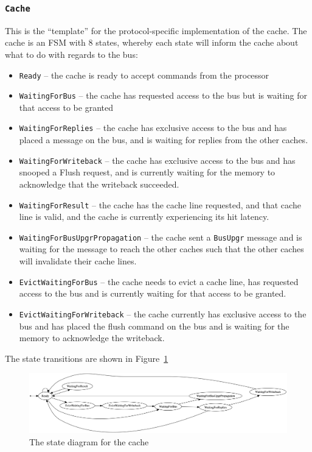 \documentclass[nonacm,acmsmall,screen,11pt]{acmart}
\begin{document}
\subsubsection{\texttt{Cache}}
This is the ``template'' for the protocol-specific implementation of the cache.
The cache is an FSM with 8 states, whereby each state will inform the cache about what to do with regards to the bus:
\begin{itemize}
  \item \texttt{Ready} -- the cache is ready to accept commands from the processor
  \item \texttt{WaitingForBus} -- the cache has requested access to the bus but is waiting for that access to be granted
  \item \texttt{WaitingForReplies} -- the cache has exclusive access to the bus and has placed a message on the bus, and is waiting for replies from the other caches.
  \item \texttt{WaitingForWriteback} -- the cache has exclusive access to the bus and has snooped a Flush request, and is currently waiting for the memory to acknowledge that the writeback succeeded.
  \item \texttt{WaitingForResult} -- the cache has the cache line requested, and that cache line is valid, and the cache is currently experiencing its hit latency.
  \item \texttt{WaitingForBusUpgrPropagation} -- the cache sent a \texttt{BusUpgr} message and is waiting for the message to reach the other caches such that the other caches will invalidate their cache lines.
  \item \texttt{EvictWaitingForBus} -- the cache needs to evict a cache line, has requested access to the bus and is currently waiting for that access to be granted.
  \item \texttt{EvictWaitingForWriteback} -- the cache currently has exclusive access to the bus and has placed the flush command on the bus and is waiting for the memory to acknowledge the writeback.
\end{itemize}

The state transitions are shown in Figure~\ref{fig:mesi_cache}

\begin{figure}[hptb]
  \centering
  \includegraphics[width=\textwidth]{mesi_cache}
  \caption{The state diagram for the cache}
  \label{fig:mesi_cache}
\end{figure}
\end{document}
